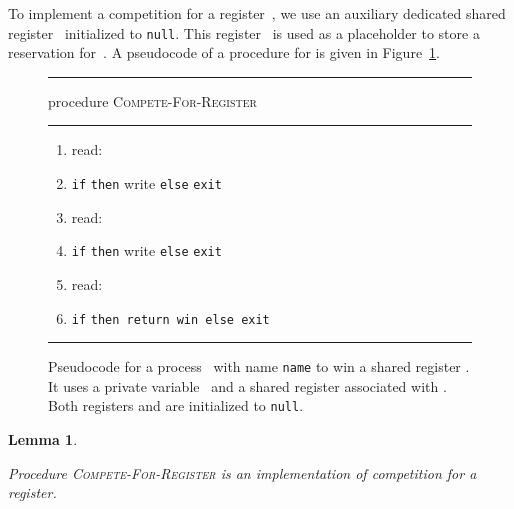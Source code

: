 \documentclass[11pt]{article}
\newcommand{\FF}{\vspace*{\medskipamount}}
\newtheorem{lemma}{Lemma}
\begin{document}
To implement a competition for a register~, we use an auxiliary dedicated shared register~ initialized to \texttt{null}.
This register~ is used as a placeholder to store a reservation for~.
A pseudocode of a procedure for  is given in Figure~\ref{fig:procedure-competition}.




\begin{figure}[t]
\hrule

\FF

\textsf{procedure} \textsc{Compete-For-Register\,}

\FF

\hrule

\FF

\begin{enumerate}[nosep]
\item
read: 

\item
\texttt{if}  \texttt{then} write  \texttt{else} \texttt{exit}

\item
read: 

\item
\texttt{if}  \texttt{then} write  \texttt{else} \texttt{exit}

\item
read: 

\item
\texttt{if}  \texttt{then return win else exit}

\end{enumerate}

\FF

\hrule

\FF

\caption{\label{fig:procedure-competition}
Pseudocode for a process~ with name \texttt{name} to win a shared register . 
It uses a private variable~ and a shared register  associated with . Both registers  and  are initialized to \texttt{null}.}
\end{figure}




\begin{lemma}
\label{lem:compete-for}

Procedure \textsc{Compete-For-Register} is an implementation of competition for a register.
\end{lemma}
\end{document}
